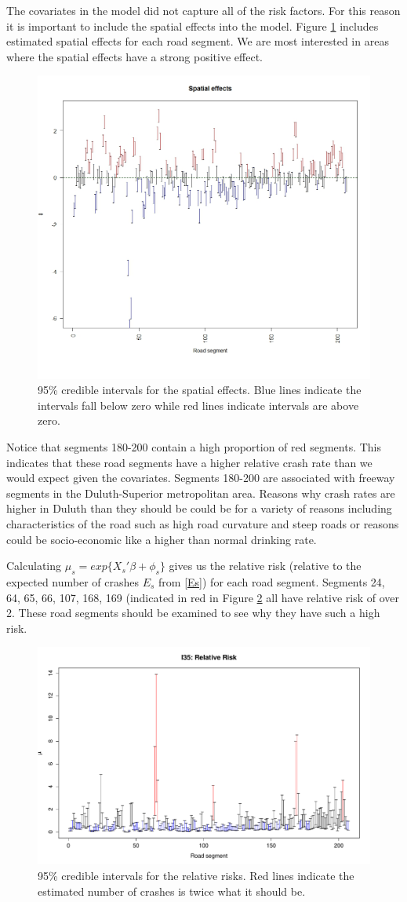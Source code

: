 The covariates in the model did not capture all of the risk factors. For this reason it is important to include the spatial effects into the model. Figure \ref{spatial} includes estimated spatial effects for each road segment. We are most interested in areas where the spatial effects have a strong positive effect. 

\begin{figure}[h]
\centering
\includegraphics[width=.70\textwidth]{spatial.jpeg}
\caption{95\% credible intervals for the spatial effects. Blue lines indicate the intervals fall below zero while red lines indicate intervals are above zero. }
\label{spatial}
\end{figure}

Notice that segments 180-200 contain a high proportion of red segments. This indicates that these road segments have a higher relative crash rate than we would expect given the covariates. Segments 180-200 are associated with freeway segments in the Duluth-Superior metropolitan area. Reasons why crash rates are higher in Duluth than they should be could be for a variety of reasons including characteristics of the road such as high road curvature and steep roads or reasons could be socio-economic like a higher than normal drinking rate. 

Calculating $\mu_s=exp\{X_s'\beta + \phi_s\}$ gives us the relative risk (relative to the expected number of crashes $E_s$ from \eqref{Es}) for each road segment. Segments 24, 64,  65,  66, 107, 168, 169 (indicated in red in Figure \ref{relrisk} all have relative risk of over 2. These road segments should be examined to see why they have such a high risk. \\

\begin{figure}[!htbp] 
\centering
\includegraphics[width=.70\textwidth]{relrisk.pdf}
\caption{95\% credible intervals for the relative risks. Red lines indicate the estimated number of crashes is twice what it should be. }
\label{relrisk}
\end{figure}

